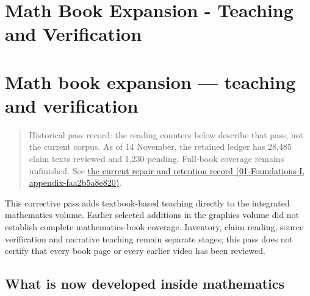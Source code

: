 \hypertarget{appendix-5056f3debc1f}{}
\section*{Math Book Expansion - Teaching and Verification}
\section{Math book expansion --- teaching and verification}\label{appendix-5056f3debc1f-math-book-expansion-teaching-and-verification}

\begin{quote}
Historical pass record: the reading counters below describe that pass, not the current corpus. As of 14 November, the retained ledger has 28,485 claim texts reviewed and 1,230 pending. Full-book coverage remains unfinished. See \href{../01-Foundations-I/main.pdf\#nameddest=appendix-faa2b5a8e820}{the current repair and retention record (01-Foundations-I, appendix-faa2b5a8e820)}.
\end{quote}

This corrective pass adds textbook-based teaching directly to the integrated mathematics volume. Earlier selected additions in the graphics volume did not establish complete mathematics-book coverage. Inventory, claim reading, source verification and narrative teaching remain separate stages; this pass does not certify that every book page or every earlier video has been reviewed.

\subsection{What is now developed inside mathematics}\label{appendix-5056f3debc1f-what-is-now-developed-inside-mathematics}

